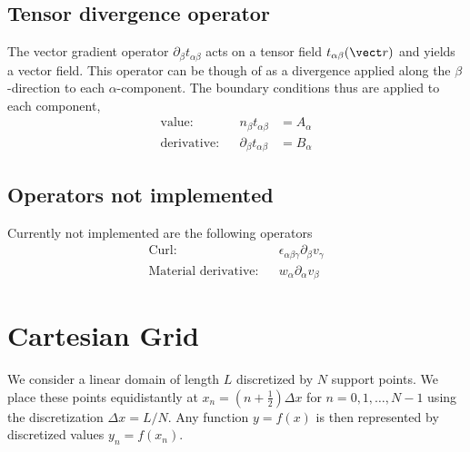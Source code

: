 \documentclass[
	superscriptaddress,
	twocolumn,
	aps, prl
]{revtex4-1}
\newcommand{\dx}{\Delta x}
\begin{document}
\subsection{Tensor divergence operator}
The vector gradient  operator $\partial_\beta t_{\alpha\beta}$ acts on a tensor field $t_{\alpha\beta}(\vect r)$ and yields a vector field.
This operator can be though of as a divergence applied along the $\beta$-direction to each $\alpha$-component.
The boundary conditions thus are applied to each component,
\begin{subequations}
\begin{align}
	\text{value:} &&	n_\beta t_{\alpha\beta} &= A_\alpha
\\
	\text{derivative:} &&\partial_\beta t_{\alpha\beta}&= B_\alpha
\end{align}
\end{subequations}

\subsection{Operators not implemented}
Currently not implemented are the following operators
\begin{subequations}
\begin{align}
	\text{Curl:} &&
		\epsilon_{\alpha\beta\gamma} \partial_\beta v_\gamma
\\
	\text{Material derivative:}&&
		w_\alpha \partial_\alpha v_\beta
\end{align} 
\end{subequations}





\section{Cartesian Grid}
We consider a linear domain of length $L$ discretized by $N$ support points.
We place these points equidistantly at $x_n = (n+\frac12)\dx$ for $n=0,1,\ldots, N-1$ using the discretization $\dx=L/N$.
Any function $y=f(x)$ is then represented by discretized values $y_n = f(x_n)$.
\end{document}
